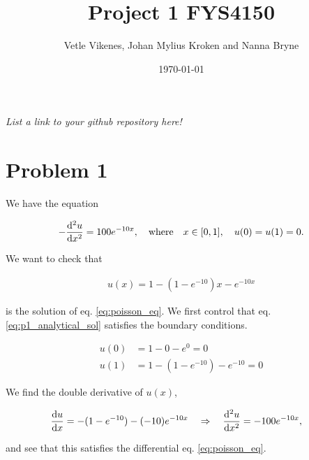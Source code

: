 \documentclass[english,notitlepage]{revtex4-1}  %
\begin{document}
\title{Project 1 FYS4150} 
\author{Vetle Vikenes, Johan Mylius Kroken and Nanna Bryne}      
\date{\today}                 
\noaffiliation       

\maketitle 
    
\textit{List a link to your github repository here!}
    
\section*{Problem 1}

We have the equation 

\begin{align}\label{eq:poisson_eq}
    -\dv[2]{u}{x} =  100e^{-10x}, \quad \text{where} \quad x\in [0,1], \quad u(0)=u(1)=0.
\end{align}


We want to check that 

\begin{align}\label{eq:p1_analytical_sol}
    u(x) = 1 - (1-e^{-10})x - e^{-10x}
\end{align}

is the solution of eq. \ref{eq:poisson_eq}. We first control that eq. \ref{eq:p1_analytical_sol} satisfies the boundary conditions. 

\begin{align*}
    u(0) &= 1 - 0 - e^{0} = 0 \\
    u(1) &= 1 - (1-e^{-10}) - e^{-10} = 0
\end{align*}
 
We find the double derivative of $u(x)$,

\begin{align*}
    \dv{u}{x} &= -(1-e^{-10}) - (-10)e^{-10x} \quad \Rightarrow \quad \dv[2]{u}{x} = -100e^{-10x},
\end{align*}

and see that this satisfies the differential eq. \ref{eq:poisson_eq}.
\end{document}
